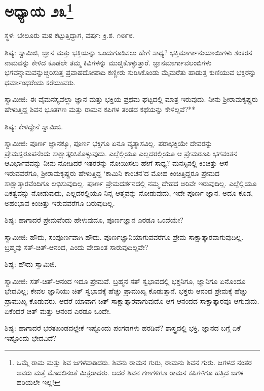\newpage

\chapter[ಅಧ್ಯಾಯ ೨೩]{ಅಧ್ಯಾಯ ೨೩\protect\footnote{ಒಮ್ಮೆ ರಾಮ ಮತ್ತು ಶಿವ ಜಗಳವಾಡಿದರು. ಶಿವನು ರಾಮನ ಗುರು, ರಾಮನು ಶಿವನ ಗುರು. ಜಗಳದ ನಂತರ ಅವರು ಮತ್ತೆ ಮೊದಲಿನಂತೆ ಮಿತ್ರರಾದರು. ಆದರೆ ಶಿವನ ಗಣಗಳಿಗೂ ರಾಮನ ಕಪಿಗಳಿಗೂ ಹತ್ತಿದ ಜಗಳ ಹರಿಯಲೇ ಇಲ್ಲ!}}

\begin{center}
ಸ್ಥಳ: ಬೇಲೂರು ಮಠ ಕಟ್ಟುತ್ತಿದ್ದಾಗ, ವರ್ಷ: ಕ್ರಿ.ಶ. ೧೮೯೮.
\end{center}

ಶಿಷ್ಯ: ಸ್ವಾಮಿಜಿ, ಜ್ಞಾನ ಮತ್ತು ಭಕ್ತಿಯನ್ನು ಒಂದುಗೂಡಿಸಲು ಹೇಗೆ ಸಾಧ್ಯ? ಭಕ್ತಿಮಾರ್ಗಾನುಯಾಯಿಗಳು ಶಂಕರನ ನಾಮವನ್ನು ಕೇಳಿದ ಕೂಡಲೇ ತಮ್ಮ ಕಿವಿಗಳನ್ನು ಮುಚ್ಚಿಕೊಳ್ಳುತ್ತಾರೆ. ಜ್ಞಾನಮಾರ್ಗಾವಲಂಬಿಗಳು ಭಗವನ್ನಾಮವನ್ನುಚ್ಚರಿಸುತ್ತ ಪ್ರವಾಹದೋಪಾದಿ ಕಣ್ಣೀರು ಸುರಿಸಿಕೊಂಡು ಮೈಮರೆತು ಹಾಡುತ್ತ ಕುಣಿಯುವ ಭಕ್ತರನ್ನು ಧರ್ಮಾಂಧರೆಂದು ಕರೆಯುವರು.

ಸ್ವಾಮೀಜಿ: ಈ ವೈಮನಸ್ಯವೆಲ್ಲಾ ಜ್ಞಾನ ಮತ್ತು ಭಕ್ತಿಯ ಪ್ರಥಮ ಘಟ್ಟದಲ್ಲಿ ಮಾತ್ರ ಇರುವುದು. ನೀನು ಶ‍್ರೀರಾಮಕೃಷ್ಣರು ಹೇಳುತ್ತಿದ್ದ ಶಿವನ ಭೂತಗಣ ಮತ್ತು ರಾಮನ ಕಪಿಗಳ ತಂಡದ ಕಥೆಯನ್ನು ಕೇಳಿಲ್ಲವೆ?**

ಶಿಷ್ಯ: ಕೇಳಿದ್ದೇನೆ ಸ್ವಾಮಿಜಿ.

ಸ್ವಾಮೀಜಿ: ಪೂರ್ಣ ಜ್ಞಾನಕ್ಕೂ, ಪೂರ್ಣ ಭಕ್ತಿಗೂ ಏನೂ ವ್ಯತ್ಯಾಸವಿಲ್ಲ. ಪರಾಭಕ್ತಿಯೇ ದೇವರನ್ನು ಪ್ರೇಮಸ್ವರೂಪನೆಂದು ಸಾಕ್ಷಾತ್ಕರಿಸಿಕೊಳ್ಳುವುದು. ಎಲ್ಲೆಲ್ಲಿಯೂ ಎಲ್ಲದರಲ್ಲಿಯೂ ಆ ಪ್ರೇಮರೂಪಿ ಭಗವಂತನ ಆವಿರ್ಭಾವವನ್ನು ನೀನು ನೋಡಿದರೆ ಇತರರನ್ನು ನೋಯಿಸಲು ಹೇಗೆ ಸಾಧ್ಯ? ಮನಸ್ಸಿನಲ್ಲಿ ಕಿಂಚಿತ್ತು ಆಸೆ ಇರುವವರೆಗೂ, ಶ‍್ರೀರಾಮಕೃಷ್ಣರು ಹೇಳುತ್ತಿದ್ದ ‘ಕಾಮಿನಿ ಕಾಂಚನ’ದ ಮೋಹ ಕಿಂಚಿತ್ತಿದ್ದರೂ ಪ್ರೇಮದ ಸಾಕ್ಷಾತ್ಕಾರವೆಂದಿಗೂ ಲಭಿಸುವುದಿಲ್ಲ. ಪೂರ್ಣ ಪ್ರೇಮದರ್ಶನದಲ್ಲಿ ನಮ್ಮ ದೇಹದ ಅರಿವೇ ಇರುವುದಿಲ್ಲ. ಎಲ್ಲೆಲ್ಲಿಯೂ ಏಕತ್ವವನ್ನು ನೋಡುವುದು, ಎಲ್ಲದರಲ್ಲಿಯೂ ನಿನ್ನ ಆತ್ಮವನ್ನು ನೋಡುವುದು, ಇದೇ ಪೂರ್ಣ ಜ್ಞಾನ. ಅದೂ ಕೂಡ, ಅಹಂಭಾವ ಕಿಂಚಿತ್ತು ಇರುವವರೆಗೂ ಬರುವುದಿಲ್ಲ.

ಶಿಷ್ಯ: ಹಾಗಾದರೆ ಪ್ರೇಮವೆಂದು ಹೇಳುವುದೂ, ಪೂರ್ಣಜ್ಞಾನ ಎರಡೂ ಒಂದೆಯೇ?

ಸ್ವಾಮೀಜಿ: ಹೌದು, ಸಂಪೂರ್ಣವಾಗಿ ಹೌದು. ಪೂರ್ಣಜ್ಞಾನಿಯಾಗುವವರೆಗೂ ಪ್ರೇಮ ಸಾಕ್ಷಾತ್ಕಾರವಾಗುವುದಿಲ್ಲ. ಬ್ರಹ್ಮವು ಸತ್-ಚಿತ್-ಆನಂದ, ಎಂದು ವೇದಾಂತ ಸಾರುವುದಿಲ್ಲವೇ?

ಶಿಷ್ಯ: ಹೌದು ಸ್ವಾಮಿಜಿ.

ಸ್ವಾಮೀಜಿ: ಸತ್-ಚಿತ್-ಆನಂದ ಇದೂ ಪ್ರೇಮವೆ. ಬ್ರಹ್ಮನ ಸತ್ ಸ್ವಭಾವದಲ್ಲಿ ಭಕ್ತನಿಗೂ, ಜ್ಞಾನಿಗೂ ಏನೊಂದೂ ಭೇದವಿಲ್ಲ; ಕೇವಲ ಜ್ಞಾನಿಯು ಚಿತ್ ಸ್ವಭಾವಕ್ಕೆ ಹೆಚ್ಚು ಪ್ರಾಮುಖ್ಯ ಕೊಡುತ್ತಾನೆ. ಭಕ್ತರು ಆನಂದ ಪ್ರೇಮಕ್ಕೆ ಹೆಚ್ಚು ಪ್ರಾಮುಖ್ಯ ಕೊಡುವರು. ಆದರೆ ಯಾವಾಗ ಚಿತ್ ಸಾಕ್ಷಾತ್ಕಾರವಾಗುವುದೊ ಆಗ ಆನಂದದ ಸಾಕ್ಷಾತ್ಕಾರವೂ ಆಗುವುದು. ಏಕೆಂದರೆ ಚಿತ್ ಮತ್ತು ಆನಂದ ಎರಡೂ ಒಂದೇ.

ಶಿಷ್ಯ: ಹಾಗಾದರೆ ಭರತಖಂಡದಲ್ಲೇಕೆ ಇಷ್ಟೊಂದು ಪಂಗಡಗಳು ಹರಡಿವೆ? ಶಾಸ್ತ್ರದಲ್ಲಿ ಭಕ್ತಿ, ಜ್ಞಾನದ ಬಗ್ಗೆ ಏಕೆ ಇಷ್ಟೊಂದು ಭೇದವಿದೆ?

